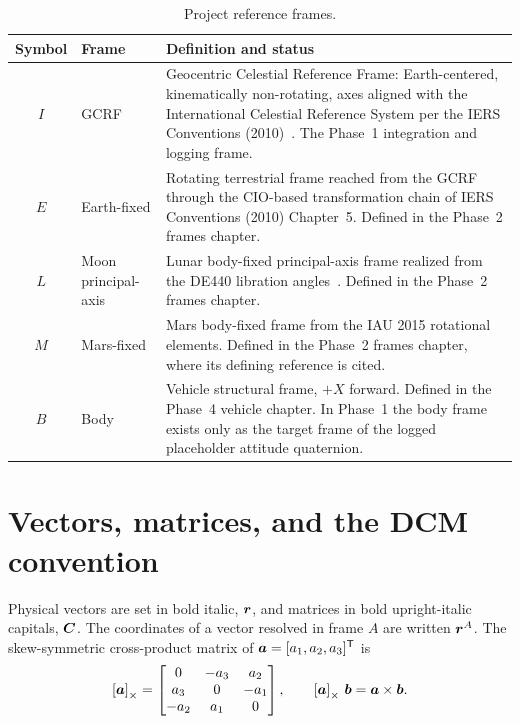 \begin{table}[htbp]
  \centering
  \caption{Project reference frames.}
  \label{tab:notation:frames}
  \begin{tabular}{clp{7.2cm}}
    \toprule
    Symbol & Frame & Definition and status \\
    \midrule
    $I$ & GCRF &
      Geocentric Celestial Reference Frame: Earth-centered, kinematically
      non-rotating, axes aligned with the International Celestial Reference
      System per the IERS Conventions (2010)~\cite{iers2010}. The Phase~1
      integration and logging frame. \\
    $E$ & Earth-fixed &
      Rotating terrestrial frame reached from the GCRF through the CIO-based
      transformation chain of IERS Conventions (2010) Chapter~5. Defined in
      the Phase~2 frames chapter. \\
    $L$ & Moon principal-axis &
      Lunar body-fixed principal-axis frame realized from the DE440 libration
      angles~\cite{park2021}. Defined in the Phase~2 frames chapter. \\
    $M$ & Mars-fixed &
      Mars body-fixed frame from the IAU 2015 rotational elements. Defined in
      the Phase~2 frames chapter, where its defining reference is cited. \\
    $B$ & Body &
      Vehicle structural frame, $+X$ forward. Defined in the Phase~4 vehicle
      chapter. In Phase~1 the body frame exists only as the target frame of
      the logged placeholder attitude quaternion. \\
    \bottomrule
  \end{tabular}
\end{table}

\section{Vectors, matrices, and the DCM convention}
\label{sec:notation:dcm}

Physical vectors are set in bold italic, $\bm{r}$, and matrices in bold
upright-italic capitals, $\bm{C}$. The coordinates of a vector resolved in
frame $A$ are written $\bm{r}^{A}$. The skew-symmetric cross-product matrix of
$\bm{a} = [a_1, a_2, a_3]^{\mathsf T}$ is
\begin{equation}
  \left[\bm{a}\right]_{\times} =
  \begin{bmatrix}
    0 & -a_3 & a_2 \\
    a_3 & 0 & -a_1 \\
    -a_2 & a_1 & 0
  \end{bmatrix},
  \qquad
  \left[\bm{a}\right]_{\times}\,\bm{b} = \bm{a} \times \bm{b}.
  \label{eq:notation:skew}
\end{equation}


